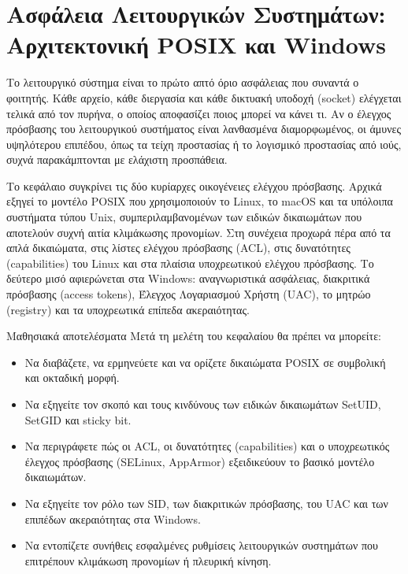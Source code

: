 \chapter{Ασφάλεια Λειτουργικών Συστημάτων: Αρχιτεκτονική POSIX και Windows}\label{ch:2}

Το λειτουργικό σύστημα είναι το πρώτο απτό όριο ασφάλειας που συναντά ο φοιτητής. Κάθε αρχείο, κάθε διεργασία και κάθε δικτυακή υποδοχή (socket) ελέγχεται τελικά από τον πυρήνα, ο οποίος αποφασίζει ποιος μπορεί να κάνει τι. Αν ο έλεγχος πρόσβασης του λειτουργικού συστήματος είναι λανθασμένα διαμορφωμένος, οι άμυνες υψηλότερου επιπέδου, όπως τα τείχη προστασίας ή το λογισμικό προστασίας από ιούς, συχνά παρακάμπτονται με ελάχιστη προσπάθεια.

Το κεφάλαιο συγκρίνει τις δύο κυρίαρχες οικογένειες ελέγχου πρόσβασης. Αρχικά εξηγεί το μοντέλο POSIX που χρησιμοποιούν το Linux, το macOS και τα υπόλοιπα συστήματα τύπου Unix, συμπεριλαμβανομένων των ειδικών δικαιωμάτων που αποτελούν συχνή αιτία κλιμάκωσης προνομίων. Στη συνέχεια προχωρά πέρα από τα απλά δικαιώματα, στις λίστες ελέγχου πρόσβασης (ACL), στις δυνατότητες (capabilities) του Linux και στα πλαίσια υποχρεωτικού ελέγχου πρόσβασης. Το δεύτερο μισό αφιερώνεται στα Windows: αναγνωριστικά ασφάλειας, διακριτικά πρόσβασης (access tokens), Έλεγχος Λογαριασμού Χρήστη (UAC), το μητρώο (registry) και τα υποχρεωτικά επίπεδα ακεραιότητας.

\begin{outcomesbox}{Μαθησιακά αποτελέσματα}
Μετά τη μελέτη του κεφαλαίου θα πρέπει να μπορείτε:
\begin{itemize}
  \item Να διαβάζετε, να ερμηνεύετε και να ορίζετε δικαιώματα POSIX σε συμβολική και οκταδική μορφή.
  \item Να εξηγείτε τον σκοπό και τους κινδύνους των ειδικών δικαιωμάτων SetUID, SetGID και sticky bit.
  \item Να περιγράφετε πώς οι ACL, οι δυνατότητες (capabilities) και ο υποχρεωτικός έλεγχος πρόσβασης (SELinux, AppArmor) εξειδικεύουν το βασικό μοντέλο δικαιωμάτων.
  \item Να εξηγείτε τον ρόλο των SID, των διακριτικών πρόσβασης, του UAC και των επιπέδων ακεραιότητας στα Windows.
  \item Να εντοπίζετε συνήθεις εσφαλμένες ρυθμίσεις λειτουργικών συστημάτων που επιτρέπουν κλιμάκωση προνομίων ή πλευρική κίνηση.
\end{itemize}
\end{outcomesbox}

